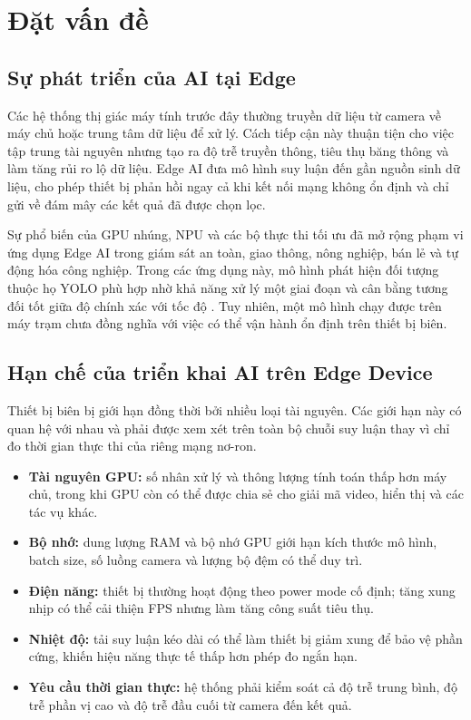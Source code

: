 \section{Đặt vấn đề}
\label{sec:dat-van-de}

\subsection{Sự phát triển của AI tại Edge}

Các hệ thống thị giác máy tính trước đây thường truyền dữ liệu từ camera về
máy chủ hoặc trung tâm dữ liệu để xử lý. Cách tiếp cận này thuận tiện cho việc
tập trung tài nguyên nhưng tạo ra độ trễ truyền thông, tiêu thụ băng thông và làm
tăng rủi ro lộ dữ liệu. Edge AI đưa mô hình suy luận đến gần nguồn sinh dữ liệu,
cho phép thiết bị phản hồi ngay cả khi kết nối mạng không ổn định và chỉ gửi về
đám mây các kết quả đã được chọn lọc.

Sự phổ biến của GPU nhúng, NPU và các bộ thực thi tối ưu đã mở rộng phạm vi ứng
dụng Edge AI trong giám sát an toàn, giao thông, nông nghiệp, bán lẻ và tự động
hóa công nghiệp. Trong các ứng dụng này, mô hình phát hiện đối tượng thuộc họ
YOLO phù hợp nhờ khả năng xử lý một giai đoạn và cân bằng tương đối tốt giữa độ
chính xác với tốc độ \cite{redmon2016,bochkovskiy2020}. Tuy nhiên, một mô hình
chạy được trên máy trạm chưa đồng nghĩa với việc có thể vận hành ổn định trên
thiết bị biên.

\subsection{Hạn chế của triển khai AI trên Edge Device}

Thiết bị biên bị giới hạn đồng thời bởi nhiều loại tài nguyên. Các giới hạn này
có quan hệ với nhau và phải được xem xét trên toàn bộ chuỗi suy luận thay vì chỉ
đo thời gian thực thi của riêng mạng nơ-ron.

\begin{itemize}
  \item \textbf{Tài nguyên GPU:} số nhân xử lý và thông lượng tính toán thấp hơn
        máy chủ, trong khi GPU còn có thể được chia sẻ cho giải mã video, hiển
        thị và các tác vụ khác.
  \item \textbf{Bộ nhớ:} dung lượng RAM và bộ nhớ GPU giới hạn kích thước mô
        hình, batch size, số luồng camera và lượng bộ đệm có thể duy trì.
  \item \textbf{Điện năng:} thiết bị thường hoạt động theo power mode cố định;
        tăng xung nhịp có thể cải thiện FPS nhưng làm tăng công suất tiêu thụ.
  \item \textbf{Nhiệt độ:} tải suy luận kéo dài có thể làm thiết bị giảm xung để
        bảo vệ phần cứng, khiến hiệu năng thực tế thấp hơn phép đo ngắn hạn.
  \item \textbf{Yêu cầu thời gian thực:} hệ thống phải kiểm soát cả độ trễ trung
        bình, độ trễ phần vị cao và độ trễ đầu cuối từ camera đến kết quả.
\end{itemize}


